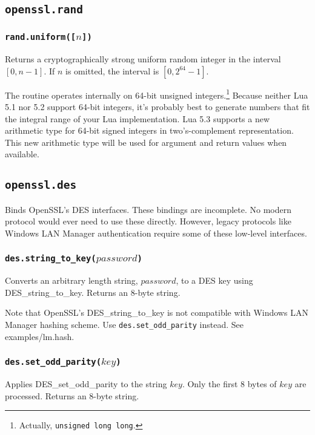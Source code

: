 \documentclass[11pt, oneside]{memoir}
\newcommand*{\fn}[1]{\texttt{#1}\xspace}
\newcounter{toccols}
\newenvironment{Module}[1]{
	\subsection{\texttt{#1}}
	\addtocontents{toc}{
		\protect\begin{multicols}{\value{toccols}}
	}
}{
	\addtocontents{toc}{\protect\end{multicols}}
}
\begin{document}
\begin{Module}{openssl.rand}
\subsubsection[\fn{rand.uniform}]{\fn{rand.uniform([$n$])}}

Returns a cryptographically strong uniform random integer in the interval $[0, n-1]$. If $n$ is omitted, the interval is $[0, 2^{64}-1]$.

The routine operates internally on 64-bit unsigned integers.\footnote{Actually, \texttt{unsigned long long}.} Because neither Lua 5.1 nor 5.2 support 64-bit integers, it's probably best to generate numbers that fit the integral range of your Lua implementation. Lua 5.3 supports a new arithmetic type for 64-bit signed integers in two's-complement representation. This new arithmetic type will be used for argument and return values when available.

\end{Module}


\begin{Module}{openssl.des}

Binds OpenSSL's DES interfaces. These bindings are incomplete. No modern protocol would ever need to use these directly. However, legacy protocols like Windows LAN Manager authentication require some of these low-level interfaces.

\subsubsection[\fn{des.string\_to\_key}]{\fn{des.string\_to\_key($password$)}}

Converts an arbitrary length string, $password$, to a DES key using DES\_string\_to\_key. Returns an 8-byte string.

Note that OpenSSL's DES\_string\_to\_key is not compatible with Windows LAN Manager hashing scheme. Use \fn{des.set\_odd\_parity} instead. See examples/lm.hash.

\subsubsection[\fn{des.set\_odd\_parity}]{\fn{des.set\_odd\_parity($key$)}}

Applies DES\_set\_odd\_parity to the string $key$. Only the first 8 bytes of $key$ are processed. Returns an 8-byte string.

\end{Module}
\end{document}

